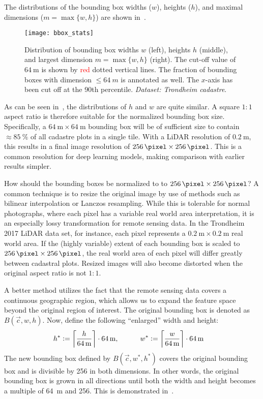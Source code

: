 The distributions of the bounding box widths ($w$), heights ($h$), and maximal dimensions ($m = \max \{w, h\}$) are shown in~.

\begin{figure}[htb]
  \texttt{[image: bbox\_stats]}
  \caption{
    Distribution of bounding box widths $w$ (left), heights $h$ (middle), and largest dimension $m = \max \{w, h\}$ (right).
    The cut-off value of $\SI{64}{\meter}$ is shown by \textcolor{red}{red} dotted vertical lines.
    The fraction of bounding boxes with dimension $\leq \SI{64}{m}$ is annotated as well.
    The $x$-axis has been cut off at the 90th percentile.
    \textit{Dataset: Trondheim cadastre}.
  }%
  \label{fig:bbox-stats}
\end{figure}

As can be seen in~, the distributions of $h$ and $w$ are quite similar.
A square $1:1$ aspect ratio is therefore suitable for the normalized bounding box size.
Specifically, a $\SI{64}{\meter} \times \SI{64}{\meter}$ bounding box will be of sufficient size to contain $\approx \SI{85}{\percent}$ of all cadastre plots in a single tile.
With a LiDAR resolution of $\SI{0.2}{\meter}$, this results in a final image resolution of $\SI{256}{\pixel} \times \SI{256}{\pixel}$.
This is a common resolution for deep learning models, making comparison with earlier results simpler.

How should the bounding boxes be normalized to to $\SI{256}{\pixel} \times \SI{256}{\pixel}$?
A common technique is to resize the original image by use of methods such as bilinear interpolation or Lanczos resampling.
While this is tolerable for normal photographs, where each pixel has a variable real world area interpretation, it is an especially lossy transformation for remote sensing data.
In the Trondheim 2017 LiDAR data set, for instance, each pixel represents a $\SI{0.2}{\meter} \times \SI{0.2}{\meter}$ real world area.
If the (highly variable) extent of each bounding box is scaled to $\SI{256}{\pixel} \times \SI{256}{\pixel}$, the real world area of each pixel will differ greatly between cadastral plots.
Resized images will also become distorted when the original aspect ratio is not $1:1$.

A better method utilizes the fact that the remote sensing data covers a continuous geographic region, which allows us to expand the feature space beyond the original region of interest.
The original bounding box is denoted as $B(\vec{c}, w, h)$.
Now, define the following \enquote{enlarged} width and height:
%
\begin{align*}
  h^* &:= \left\lceil \frac{h}{\SI{64}{\meter}} \right\rceil \cdot \SI{64}{\meter},
  \hspace{3em}
  w^* := \left\lceil \frac{w}{\SI{64}{\meter}} \right\rceil \cdot \SI{64}{\meter}
\end{align*}
%
The new bounding box defined by $B(\vec{c}, w^*, h^*)$ covers the original bounding box and is divisible by \SI{256}{\pixel} in both dimensions.
In other words, the original bounding box is grown in all directions until both the width and height becomes a multiple of \SI{64}{\meter} and \SI{256}{\pixel}.
This is demonstrated in~.


